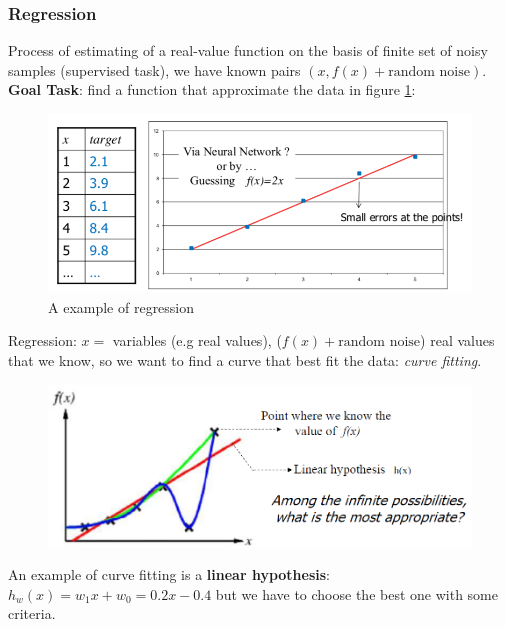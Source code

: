 \documentclass[../main.tex]{subfiles}
\begin{document}
\newpage
\subsubsection{Regression}
    Process of estimating of a real-value function on the basis of finite set of noisy samples (supervised task), we have known pairs $(x, f(x)+\text{random noise})$.\\
    \textbf{Goal Task}: find a function that approximate the data in figure \ref{fig:intro_regression_exp1}:
    \begin{figure}[H]
        \centering
        \includegraphics[scale = 0.3]{lectures/1_Introduction/intro_regression_exp1.png}
        \caption{A example of regression }
        \label{fig:intro_regression_exp1}
    \end{figure}
    Regression: $x =$ variables (e.g real values), ($f(x)+\text{random noise}$) real values that we know, so we want to find a curve that best fit the data: \textit{curve fitting}.
    \begin{figure}[h]
        \centering
        \includegraphics[scale = 0.4]{lectures/1_Introduction/regression.png}
    \end{figure}
    An example of curve fitting is a \textbf{linear hypothesis}: $h_w(x) = w_1x + w_0 = 0.2x-0.4$ but we have to choose the best one with some criteria.
\end{document}
